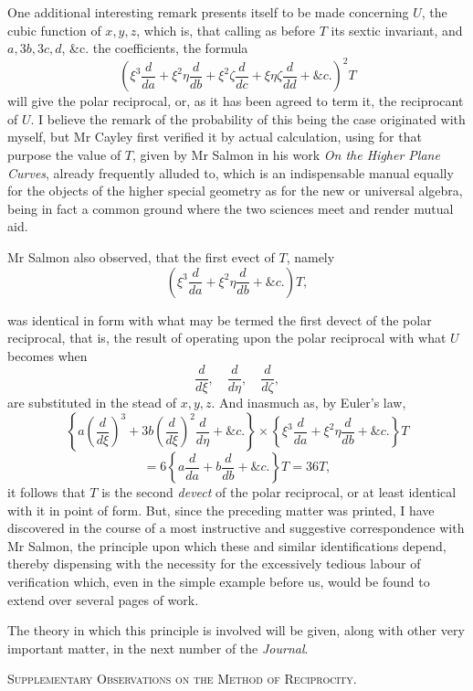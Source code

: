 \documentclass[11pt]{article}
\newcommand{\subpaperhead}[1]{\begin{center}{\large\scshape #1}\end{center}}
\newcommand{\sourcepage}[1]{\marginpar{\scriptsize p.~#1}}
\begin{document}
{{One additional interesting remark presents itself to be made concerning $U$, the cubic function of $x,y,z$, which is, that calling as before $T$ its sextic invariant, and $a,3b,3c,d$, \&c. the coefficients, the formula
\[
\left(\xi^3\frac{d}{da}+\xi^2\eta\frac{d}{db}
+\xi^2\zeta\frac{d}{dc}+\xi\eta\zeta\frac{d}{dd}
+\&c.\right)^2T
\]
will give the polar reciprocal, or, as it has been agreed to term it, the reciprocant of $U$. I believe the remark of the probability of this being the case originated with myself, but Mr Cayley first verified it by actual calculation, using for that purpose the value of $T$, given by Mr Salmon in his work \emph{On the Higher Plane Curves}, already frequently alluded to, which is an indispensable manual equally for the objects of the higher special geometry as for the new or universal algebra, being in fact a common ground where the two sciences meet and render mutual aid.

Mr Salmon also observed, that the first evect of $T$, namely
\[
\left(\xi^3\frac{d}{da}+\xi^2\eta\frac{d}{db}+\&c.\right)T,
\]

\sourcepage{339}
was identical in form with what may be termed the first devect of the polar reciprocal, that is, the result of operating upon the polar reciprocal with what $U$ becomes when
\[
\frac{d}{d\xi},\quad \frac{d}{d\eta},\quad \frac{d}{d\zeta},
\]
are substituted in the stead of $x,y,z$. And inasmuch as, by Euler's law,
\[
\left\{a\left(\frac{d}{d\xi}\right)^3
+3b\left(\frac{d}{d\xi}\right)^2\frac{d}{d\eta}
+\&c.\right\}
\times
\left\{\xi^3\frac{d}{da}+\xi^2\eta\frac{d}{db}+\&c.\right\}T
\]
\[
=6\left\{a\frac{d}{da}+b\frac{d}{db}+\&c.\right\}T=36T,
\]
it follows that $T$ is the second \emph{devect} of the polar reciprocal, or at least identical with it in point of form. But, since the preceding matter was printed, I have discovered in the course of a most instructive and suggestive correspondence with Mr Salmon, the principle upon which these and similar identifications depend, thereby dispensing with the necessity for the excessively tedious labour of verification which, even in the simple example before us, would be found to extend over several pages of work.

The theory in which this principle is involved will be given, along with other very important matter, in the next number of the \emph{Journal}.

\subpaperhead{Supplementary Observations on the Method of Reciprocity.}

}}
\end{document}
